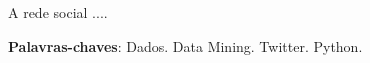 \begin{resumo}[RESUMO]	
A rede social ....



 \vspace{\onelineskip}
    
 \noindent
 \textbf{Palavras-chaves}: Dados. Data Mining. Twitter. Python.
\end{resumo}
